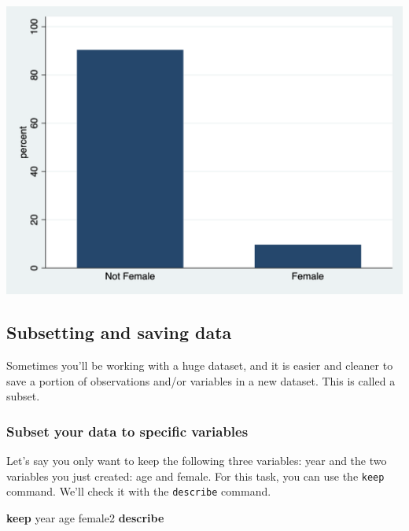 \documentclass[
]{book}
\newenvironment{Shaded}{\begin{snugshade}}{\end{snugshade}}
\newcommand{\FunctionTok}[1]{\textcolor[rgb]{0.00,0.00,0.00}{#1}}
\newcommand{\KeywordTok}[1]{\textcolor[rgb]{0.13,0.29,0.53}{\textbf{#1}}}
\newcommand{\NormalTok}[1]{#1}
\begin{document}
\includegraphics{images/bar_stata.png}

\hypertarget{subsetting-and-saving-data}{%
\subsection*{Subsetting and saving data}\label{subsetting-and-saving-data}}

Sometimes you'll be working with a huge dataset, and it is easier and cleaner to save a portion of observations and/or variables in a new dataset. This is called a subset.

\hypertarget{keep}{%
\subsubsection*{Subset your data to specific variables}\label{keep}}

Let's say you only want to keep the following three variables: year and the two variables you just created: age and female. For this task, you can use the \texttt{keep} command. We'll check it with the \texttt{describe} command.

\begin{Shaded}
\begin{Highlighting}[]
\KeywordTok{keep} \FunctionTok{year}\NormalTok{ age female2}
\KeywordTok{describe}
\end{Highlighting}
\end{Shaded}
\end{document}
